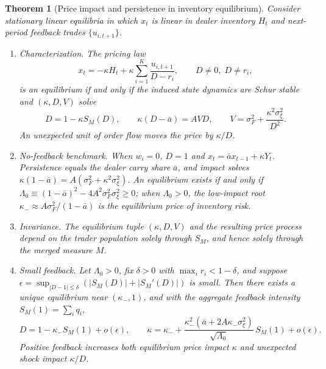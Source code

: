 \documentclass[11pt,letterpaper]{article}
\newtheorem{theorem}{Theorem}[section]
\theoremstyle{definition}
\begin{document}
\begin{theorem}[Price impact and persistence in inventory equilibrium]\label{n:thm_inventory}
Consider stationary linear equilibria in which $x_t$ is linear in dealer inventory $H_t$ and next-period feedback trades $\{u_{i,t+1}\}$.
\begin{enumerate}
  \item[(i)] \emph{Characterization.} The pricing law
  \[
    x_t = -\kappa H_t + \kappa \sum_{i=1}^K \frac{u_{i,t+1}}{D - r_i}, \qquad D \neq 0, \; D \neq r_i,
  \]
  is an equilibrium if and only if the induced state dynamics are Schur stable and $(\kappa, D, V)$ solve
  \begin{equation}\label{eq:eq-system}
    D = 1 - \kappa S_M(D), \qquad \kappa(D - \bar{a}) = A V D, \qquad V = \sigma_F^2 + \frac{\kappa^2 \sigma_\xi^2}{D^2}.
  \end{equation}
  An unexpected unit of order flow moves the price by $\kappa / D$.
  \item[(ii)] \emph{No-feedback benchmark.} When $w_i = 0$, $D = 1$ and $x_t = \bar{a} x_{t-1} + \kappa Y_t$. Persistence equals the dealer carry share $\bar{a}$, and impact solves $\kappa(1 - \bar{a}) = A(\sigma_F^2 + \kappa^2 \sigma_\xi^2)$. An equilibrium exists if and only if $\Lambda_0 \equiv (1 - \bar{a})^2 - 4 A^2 \sigma_F^2 \sigma_\xi^2 \ge 0$; when $\Lambda_0 > 0$, the low-impact root $\kappa_- \approx A \sigma_F^2 / (1 - \bar{a})$ is the equilibrium price of inventory risk.
  \item[(iii)] \emph{Invariance.} The equilibrium tuple $(\kappa, D, V)$ and the resulting price process depend on the trader population solely through $S_M$, and hence solely through the merged measure $M$.
  \item[(iv)] \emph{Small feedback.} Let $\Lambda_0 > 0$, fix $\delta > 0$ with $\max_i r_i < 1 - \delta$, and suppose $\epsilon = \sup_{|D - 1| \le \delta}(|S_M(D)| + |S_M'(D)|)$ is small. Then there exists a unique equilibrium near $(\kappa_-, 1)$, and with the aggregate feedback intensity $S_M(1) = \sum_i q_i$,
  \[
    D = 1 - \kappa_- S_M(1) + o(\epsilon), \qquad
    \kappa = \kappa_- + \frac{\kappa_-^2(\bar{a} + 2 A \kappa_- \sigma_\xi^2)}{\sqrt{\Lambda_0}}\, S_M(1) + o(\epsilon).
  \]
  Positive feedback increases both equilibrium price impact $\kappa$ and unexpected shock impact $\kappa / D$.
\end{enumerate}
\end{theorem}
\end{document}
